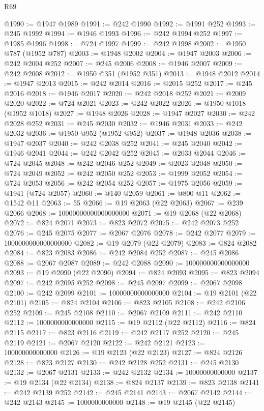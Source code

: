 \begin{lexlean}{R69}
\begin{coremodule}
{@1990 := @1947 @1989
@1991 := @242 @1990
@1992 := @1991 @252
@1993 := @245 @1992
@1994 := @1946 @1993
@1996 := @242 @1994 @252
@1997 := @1985 @1996
@1998 := @724 @1997
@1999 := @242 @1998
@2002 := @1950 @787 (@1952 @787)
@2003 := @1948 @2002
@2004 := @1947 @2003
@2006 := @242 @2004 @252
@2007 := @245 @2006
@2008 := @1946 @2007
@2009 := @242 @2008
@2012 := @1950 @351 (@1952 @351)
@2013 := @1948 @2012
@2014 := @1947 @2013
@2015 := @242 @2014
@2016 := @2015 @252
@2017 := @245 @2016
@2018 := @1946 @2017
@2020 := @242 @2018 @252
@2021 := @2009 @2020
@2022 := @724 @2021
@2023 := @242 @2022
@2026 := @1950 @1018 (@1952 @1018)
@2027 := @1948 @2026
@2028 := @1947 @2027
@2030 := @242 @2028 @252
@2031 := @245 @2030
@2032 := @1946 @2031
@2033 := @242 @2032
@2036 := @1950 @952 (@1952 @952)
@2037 := @1948 @2036
@2038 := @1947 @2037
@2040 := @242 @2038 @252
@2041 := @245 @2040
@2042 := @1946 @2041
@2044 := @242 @2042 @252
@2045 := @2033 @2044
@2046 := @724 @2045
@2048 := @242 @2046 @252
@2049 := @2023 @2048
@2050 := @724 @2049
@2052 := @242 @2050 @252
@2053 := @1999 @2052
@2054 := @724 @2053
@2056 := @242 @2054 @252
@2057 := @1975 @2056
@2059 := @1941 (@724 @2057)
@2060 := @140 @2059
@2061 := @800 @11
@2062 := @1542 @11
@2063 := 55
@2066 := @19 @2063 (@22 @2063)
@2067 := @239 @2066
@2068 := 10000000000000000000
@2071 := @19 @2068 (@22 @2068)
@2072 := @824 @2071
@2073 := @823 @2072
@2075 := @242 @2073 @252
@2076 := @245 @2075
@2077 := @2067 @2076
@2078 := @242 @2077
@2079 := 1000000000000000000
@2082 := @19 @2079 (@22 @2079)
@2083 := @824 @2082
@2084 := @823 @2083
@2086 := @242 @2084 @252
@2087 := @245 @2086
@2088 := @2067 @2087
@2089 := @242 @2088
@2090 := 100000000000000000
@2093 := @19 @2090 (@22 @2090)
@2094 := @824 @2093
@2095 := @823 @2094
@2097 := @242 @2095 @252
@2098 := @245 @2097
@2099 := @2067 @2098
@2100 := @242 @2099
@2101 := 10000000000000000
@2104 := @19 @2101 (@22 @2101)
@2105 := @824 @2104
@2106 := @823 @2105
@2108 := @242 @2106 @252
@2109 := @245 @2108
@2110 := @2067 @2109
@2111 := @242 @2110
@2112 := 1000000000000000
@2115 := @19 @2112 (@22 @2112)
@2116 := @824 @2115
@2117 := @823 @2116
@2119 := @242 @2117 @252
@2120 := @245 @2119
@2121 := @2067 @2120
@2122 := @242 @2121
@2123 := 100000000000000
@2126 := @19 @2123 (@22 @2123)
@2127 := @824 @2126
@2128 := @823 @2127
@2130 := @242 @2128 @252
@2131 := @245 @2130
@2132 := @2067 @2131
@2133 := @242 @2132
@2134 := 10000000000000
@2137 := @19 @2134 (@22 @2134)
@2138 := @824 @2137
@2139 := @823 @2138
@2141 := @242 @2139 @252
@2142 := @245 @2141
@2143 := @2067 @2142
@2144 := @242 @2143
@2145 := 1000000000000
@2148 := @19 @2145 (@22 @2145)
}
\end{coremodule}
\end{lexlean}
